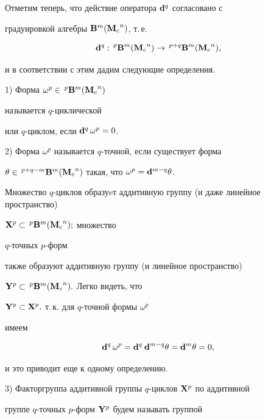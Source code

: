 Отметим теперь, что действие оператора ${\bold d}^q$ согласовано с


градуировкой алгебры ${\bold B}^m({\bold M_c}^n)$, т.\,е.


$$


{\bold d}^q:\,^p{\bold B}^m({\bold M_c}^n)\to


\,^{p+q}{\bold B}^m({\bold M_c}^n),


$$


и в соответствии с этим дадим следующие определения.





1) Форма $\omega^p\in \,^p{\bold B}^m({\bold M_c}^n)$


называется $q$-циклической


или $q$-циклом, если ${\bold d}^q\,\omega^p=0$.





2) Форма $\omega^p$ называется $q$-точной, если существует форма


$\theta \in \,^{p+q-m}{\bold B}^m({\bold M_c}^n)$ такая, что $\omega^p


={\bold d}^{m-q}\theta$.





Множество $q$-циклов образуeт аддитивную группу (и даже линейное пространство)


${\bold X}^p\subset \,^p{\bold B}^m({\bold M_c}^n);$ множество


$q$-точных $p$-форм


также образуют аддитивную группу (и линейное пространство)


${\bold Y}^p\subset \,^p{\bold B}^m({\bold M_c}^n).$ Легко видеть, что


${\bold Y}^p\subset {\bold X}^p,$ т.\,к. для $q$-точной формы $\omega^p$


имеем


$$


{\bold d}^q\, \omega^p = {\bold d}^q\: {\bold d}^{m-q}\theta = {\bold d}^m


\theta = 0,


$$


и это приводит еще к одному определению.





3) Факторгруппа аддитивной группы $q$-циклов ${\bold X}^p$ по аддитивной


группе $q$-точных $p$-форм ${\bold Y}^p$ будем называть группой


